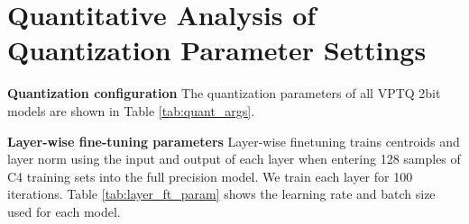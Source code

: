 \section{Quantitative Analysis of Quantization Parameter Settings}
\label{appendix:analysis}
\textbf{Quantization configuration}
The quantization parameters of all VPTQ 2bit models are shown in Table \ref{tab:quant_args}.



\textbf{Layer-wise fine-tuning parameters}
Layer-wise finetuning trains centroids and layer norm using the input and output of each layer when entering 128 samples of C4 training sets into the full precision model. We train each layer for 100 iterations. Table \ref{tab:layer_ft_param} shows the learning rate and batch size used for each model.



